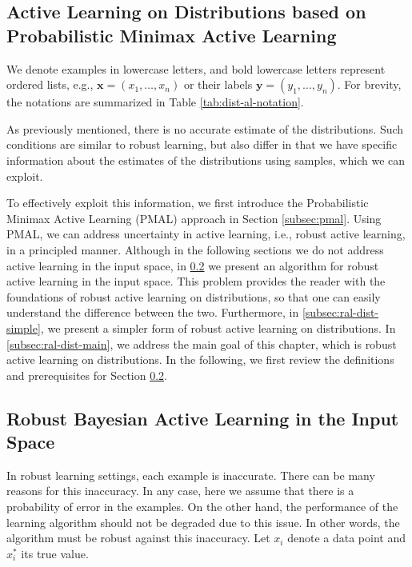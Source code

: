 	\subsection{Active Learning on Distributions based on Probabilistic Minimax Active Learning}
	\label{subsec:proposed-method}
	
	We denote examples in lowercase letters, and bold lowercase letters represent ordered lists, e.g., $\mathbf{x} = (x_1, \ldots, x_n)$ or their labels $\mathbf{y} = (y_1, \ldots, y_n)$. For brevity, the notations are summarized in Table \ref{tab:dist-al-notation}.
	
	As previously mentioned, there is no accurate estimate of the distributions. Such conditions are similar to robust learning, but also differ in that we have specific information about the estimates of the distributions using samples, which we can exploit.
	
	To effectively exploit this information, we first introduce the Probabilistic Minimax Active Learning (PMAL) approach in Section \ref{subsec:pmal}. Using PMAL, we can address uncertainty in active learning, i.e., robust active learning, in a principled manner. Although in the following sections we do not address active learning in the input space, in \ref{subsec:ral-input} we present an algorithm for robust active learning in the input space. This problem provides the reader with the foundations of robust active learning on distributions, so that one can easily understand the difference between the two. Furthermore, in \ref{subsec:ral-dist-simple}, we present a simpler form of robust active learning on distributions. In \ref{subsec:ral-dist-main}, we address the main goal of this chapter, which is robust active learning on distributions. In the following, we first review the definitions and prerequisites for Section \ref{subsec:ral-input}.
	
	\subsection{Robust Bayesian Active Learning in the Input Space}
	\label{subsec:ral-input}
	
	In robust learning settings, each example is inaccurate. There can be many reasons for this inaccuracy. In any case, here we assume that there is a probability of error in the examples. On the other hand, the performance of the learning algorithm should not be degraded due to this issue. In other words, the algorithm must be robust against this inaccuracy. Let $x_i$ denote a data point and $x_i^*$ its true value.
	
